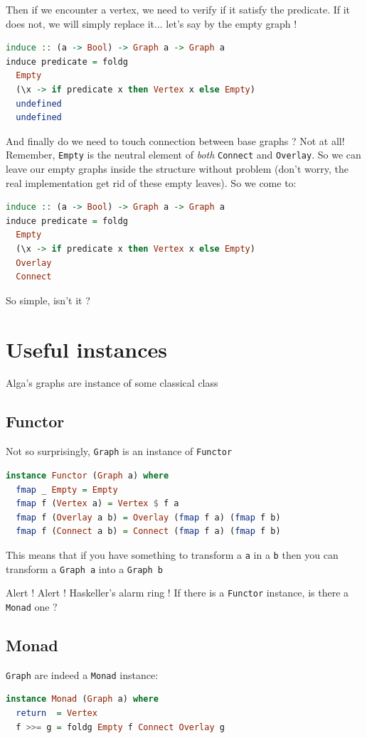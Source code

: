 \documentclass[10pt,a4paper]{article}
\begin{document}
Then if we encounter a vertex, we need to verify if it satisfy the predicate. If it does not, we will simply replace it... let's say by the empty graph !

\begin{lstlisting}[language=Haskell, frame=single]
induce :: (a -> Bool) -> Graph a -> Graph a
induce predicate = foldg 
  Empty
  (\x -> if predicate x then Vertex x else Empty)
  undefined
  undefined
\end{lstlisting}
 
And finally do we need to touch connection between base graphs ? Not at all! Remember, \verb|Empty| is the neutral element of \emph{both} \verb|Connect| and \verb|Overlay|. So we can leave our empty graphs inside the structure without problem (don't worry, the real implementation get rid of these empty leaves). So we come to:

\begin{lstlisting}[language=Haskell, frame=single]
induce :: (a -> Bool) -> Graph a -> Graph a
induce predicate = foldg 
  Empty 
  (\x -> if predicate x then Vertex x else Empty)
  Overlay
  Connect
\end{lstlisting}

So simple, isn't it ?
 
\section{Useful instances}
Alga's graphs are instance of some classical class

\subsection{Functor}
Not so surprisingly, \verb|Graph| is an instance of \verb|Functor|
\begin{lstlisting}[language=Haskell, frame=single]
instance Functor (Graph a) where
  fmap _ Empty = Empty
  fmap f (Vertex a) = Vertex $ f a
  fmap f (Overlay a b) = Overlay (fmap f a) (fmap f b)
  fmap f (Connect a b) = Connect (fmap f a) (fmap f b)
\end{lstlisting}
 
This means that if you have something to transform a \verb|a| in a \verb|b| then you can transform a \verb|Graph a| into a \verb|Graph b|
 
Alert ! Alert ! Haskeller's alarm ring ! If there is a \verb|Functor| instance, is there a \verb|Monad| one ?
\subsection{Monad}
\verb|Graph| are indeed a \verb|Monad| instance:
\begin{lstlisting}[language=Haskell, frame=single]
instance Monad (Graph a) where
  return  = Vertex
  f >>= g = foldg Empty f Connect Overlay g 
\end{lstlisting}
\end{document}
